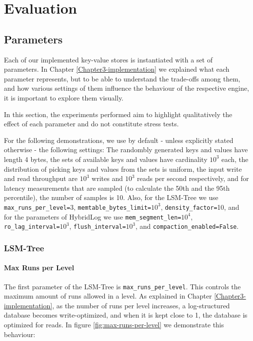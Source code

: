 
\chapter{Evaluation}

\label{Chapter4-evaluation}


\section{Parameters}

Each of our implemented key-value stores is instantiated with a set of parameters. In Chapter \ref{Chapter3-implementation} we explained what each parameter represents, but to be able to understand the trade-offs among them, and how various settings of them influence the behaviour of the respective engine, it is important to explore them visually.

In this section, the experiments performed aim to highlight qualitatively the effect of each parameter and do not constitute stress tests.

For the following demonstrations, we use by default - unless explicitly stated otherwise - the following settings: The randombly generated keys and values have length 4 bytes, the sets of available keys and values have cardinality $10^3$ each, the distribution of picking keys and values from the sets is uniform, the input write and read throughput are $10^3$ writes and $10^3$ reads per second respectively, and for latency measurements that are sampled (to calculate the 50th and the 95th percentile), the number of samples is 10. Also, for the LSM-Tree we use \verb"max_runs_per_level="3, \verb"memtable_bytes_limit="$10^3$, \verb"density_factor="10, and for the parameters of HybridLog we use \verb"mem_segment_len="$10^4$, \verb"ro_lag_interval="$10^3$, \verb"flush_interval="$10^3$, and \verb"compaction_enabled=False".

\subsection{LSM-Tree}

\subsubsection{Max Runs per Level}

The first parameter of the LSM-Tree is \verb"max_runs_per_level". This controls the maximum amount of runs allowed in a level. As explained in Chapter \ref{Chapter3-implementation}, as the number of runs per level increases, a log-structured database becomes write-optimized, and when it is kept close to 1, the database is optimized for reads. In figure \ref{fig:max-runs-per-level} we demonstrate this behaviour:

